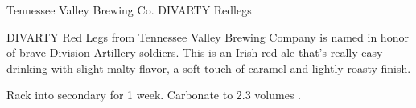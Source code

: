 \stylesection{\styleirishredale}

\begin{recipie}{Tennessee Valley Brewing Co. DIVARTY Redlegs}

\begin{aboutblock}
DIVARTY Red Legs from Tennessee Valley Brewing Company is named in honor of brave
Division Artillery soldiers. This is an Irish red ale that's really easy drinking
with slight malty flavor, a soft touch of caramel and lightly roasty finish.
\end{aboutblock}


\begin{methodandtiming}
 
\begin{mashsteps}
\end{mashsteps}

\begin{fermentationsteps}
\end{fermentationsteps}

\begin{directions}
Rack into secondary for 1 week. Carbonate to 2.3 volumes .

\end{directions}

\end{methodandtiming}

\pagebreak

\begin{ingredientsblock}

\begin{malts}
\end{malts}

\begin{hops}
\end{hops}

\begin{yeasts}
\end{yeasts}

\end{ingredientsblock}

\end{recipie}
